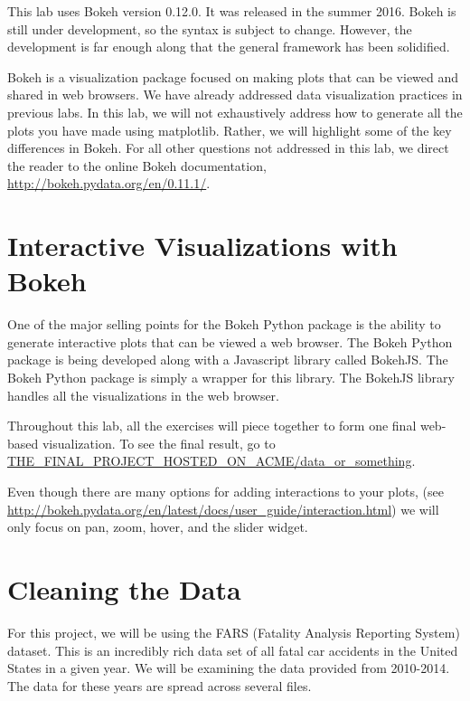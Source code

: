 \label{lab:Bokeh}



\begin{warn}
This lab uses Bokeh version 0.12.0. It was released in the summer 2016. Bokeh
is still under development, so the syntax is subject to change. However, the
development is far enough along that the general framework has been solidified.
\end{warn}

Bokeh is a visualization package focused on making plots that can be viewed and
shared in web browsers. We have already addressed data visualization practices
in previous labs. In this lab, we will not exhaustively address how to generate
all the plots you have made using matplotlib. Rather, we will highlight some of
the key differences in Bokeh. For all other questions not addressed in this lab,
we direct the reader to the online Bokeh documentation,
\url{http://bokeh.pydata.org/en/0.11.1/}.

\section*{Interactive Visualizations with Bokeh}

One of the major selling points for the Bokeh Python package is the ability to
generate interactive plots that can be viewed a web browser.
The Bokeh Python package is being developed along with a Javascript library
called BokehJS. The Bokeh Python package is simply a wrapper for this library.
The BokehJS library handles all the visualizations in the web browser.

Throughout this lab, all the exercises will piece together to form one final
web-based visualization. To see the final result, go to
\url{THE_FINAL_PROJECT_HOSTED_ON_ACME/data_or_something}.

Even though there are many options for adding interactions to your plots,
(see \url{http://bokeh.pydata.org/en/latest/docs/user_guide/interaction.html})
we will only focus on pan, zoom, hover, and the slider widget.

\section*{Cleaning the Data}
For this project, we will be using the FARS (Fatality Analysis Reporting System)
dataset. This is an incredibly rich data set of all fatal car accidents in the
United States in a given year. We will be examining the data provided from
2010-2014. The data for these years are spread across several files.

